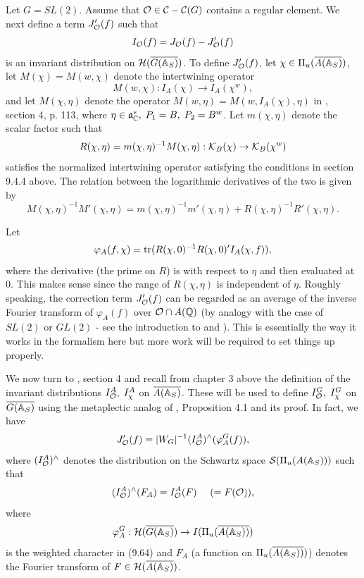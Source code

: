 Let $G=SL(2)$. Assume that
${\cal{O}}\in {\cal{C}}-{\cal{C}}(G)$
contains a regular element.
We next define a term $J_{{\cal{O}}}^{\prime }(f)$
such that 
\begin{equation}
I_{{\cal{O}}}(f)=J_{{\cal{O}}}(f)-J_{{\cal{O}}}^{\prime }(f)
\end{equation}
is an invariant distribution on ${\cal{H}}(\overline{G({\Bbb{A}}_S)})$.
To define $J_{\cal{O}}^{\prime }(f)$, let
$\chi \in \Pi _u(\overline{A({\Bbb{A}}_S)})$, let
$M(\chi )=M(w,\chi)$ denote the intertwining operator
\[
M(w,\chi):I_A(\chi )\rightarrow I_A(\chi ^w),
\]
and let $M(\chi ,\eta )$ denote the operator
$M(w,\eta )=M(w,I_A(\chi ),\eta)$ in \cite{A2}, section 4, p. 113,
where $\eta \in {\frak {a}}_{{\Bbb {C}}}^{*},\;P_1=B,\;P_2=B^w$.
Let $m(\chi ,\eta )$ denote the scalar factor such that 
\begin{equation}
R(\chi ,\eta )=m(\chi ,\eta )^{-1}M(\chi ,\eta ):
{\cal K}_B(\chi )\rightarrow {\cal K}_B(\chi ^w)
\end{equation}
satisfies the normalized intertwining operator satisfying the conditions in
section 9.4.4 above. The relation between the logarithmic
derivatives of the two is given by
\begin{equation}
M(\chi ,\eta )^{-1}M'(\chi ,\eta )=
m(\chi ,\eta )^{-1}m'(\chi ,\eta )+
R(\chi ,\eta )^{-1}R'(\chi ,\eta ).
\end{equation}

Let 
\begin{equation}
\varphi _A(f,\chi )
={\rm tr}(R(\chi ,0)^{-1}R(\chi ,0)^{\prime }I_A(\chi ,f)),
\end{equation}
where the derivative (the prime on $R$) is with respect to $\eta $ and then
evaluated at $0$. This makes sense since the range of $R(\chi ,\eta )$ is
independent of $\eta $.
Roughly speaking, the correction term $J_{\cal{O}}^{\prime }(f)$ can be
regarded as an average of the inverse Fourier transform of $\varphi _A(f)$
over ${\cal{O}}\cap A({\Bbb{Q}})$
(by analogy with the case of $SL(2)$ or $GL(2)$
- see the introduction to \cite{A6} and \cite{LL}). This is
essentially the way
it works in the formalism here but more work will be required to set things
up properly.

We now turn to \cite{A6}, section 4 and recall from
chapter 3 above the
definition of the invariant distributions
$I_{{\cal{O}}}^A,\;I_\chi ^A$ on $\overline{A({\Bbb{A}}_S)}$.
These will be used to define $I_{{\cal{O}}}^G,\;I_\chi ^G$ on 
$\overline{G({\Bbb{A}}_S)}$ using the metaplectic analog of
\cite{A6}, Proposition 4.1 and its proof. In fact, we
have 
\begin{equation}
J_{{\cal{O}}}^{\prime }(f)
=|W_G|^{-1}(I_{{\cal{O}}}^A)^{\wedge }(\varphi^G_A(f)),
\end{equation}
where $(I_{{\cal{O}}}^A)^{\wedge }$ denotes the distribution on the
Schwartz space ${\cal{S}}(\Pi _u(A({\Bbb {A}}_S)))$ such that 
\[
(I_{\cal{O}}^A)^{\wedge }(F_A)=I_{\cal{O}}^A(F)\ \ \ \ (=F({\cal{O}})), 
\]
where 
\[
\varphi_A^G:{\cal{H}}(\overline{G({\Bbb {A}}_S)})\rightarrow
I(\Pi _u(\overline{A({\Bbb {A}_S)})}) 
\]
is the weighted character in (9.64) and $F_A$ (a function on
$\Pi_u(\overline{A({\Bbb {A}_S)})}) $) denotes the Fourier transform
of $F\in {\cal{H}}(\overline{A({\Bbb {A}}_S)})$.

